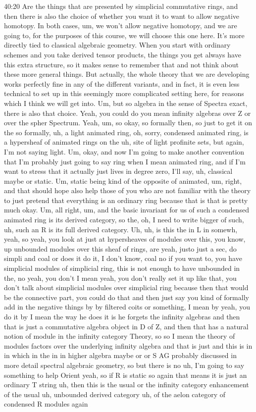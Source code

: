 \begin{unfinished}{40:20}
Are the things that are presented by simplicial commutative rings, and then there is also the choice of whether you want it to want to allow negative homotopy. In both cases, um, we won't allow negative homotopy, and we are going to, for the purposes of this course, we will choose this one here. It's more directly tied to classical algebraic geometry. When you start with ordinary schemes and you take derived tensor products, the things you get always have this extra structure, so it makes sense to remember that and not think about these more general things. But actually, the whole theory that we are developing works perfectly fine in any of the different variants, and in fact, it is even less technical to set up in this seemingly more complicated setting here, for reasons which I think we will get into. Um, but so algebra in the sense of Spectra exact, there is also that choice. Yeah, you could do you mean infinity algebras over Z or over the spher Spectrum. Yeah, um, so okay, so formally then, so just to get it on the so formally, uh, a light animated ring, oh, sorry, condensed animated ring, is a hypersheaf of animated rings on the uh, site of light profinite sets, but again, I'm not saying light. Um, okay, and now I'm going to make another convention that I'm probably just going to say ring when I mean animated ring, and if I'm want to stress that it actually just lives in degree zero, I'll say, uh, classical maybe or static. Um, static being kind of the opposite of animated, um, right, and that should hope also help those of you who are not familiar with the theory to just pretend that everything is an ordinary ring because that is that is pretty much okay. Um, all right, um, and the basic invariant for us of such a condensed animated ring is its derived category, so the, oh, I need to write bigger of such, uh, such an R is its full derived category. Uh, uh, is this the in L in somewh, yeah, so yeah, you look at just at hypersheaves of modules over this, you know, up unbounded modules over this sheaf of rings, are yeah, justo just a sec, do simpli and coal or does it do it, I don't know, coal no if you want to, you have simplicial modules of simplicial ring, this is not enough to have unbounded in the, no yeah, you don't I mean yeah, you don't really set it up like that, you don't talk about simplicial modules over simplicial ring because then that would be the connective part, you could do that and then just say you kind of formally add in the negative things by by filtered coits or something, I mean by yeah, you do it by I mean the way he does it is he forgets the infinity algebras and then that is just a commutative algebra object in D of Z, and then that has a natural notion of module in the infinity category Theory, so so I mean the theory of modules factors over the underlying infinity algebra and that is just and this is in in which in the in in higher algebra maybe or or S AG probably discussed in more detail spectral algebraic geometry, so but there is no uh, I'm going to say something to help Orient yeah, so if R is static so again that means it is just an ordinary T string uh, then this is the usual or the infinity category enhancement of the usual uh, unbounded derived category uh, of the aelon category of condensed R modules again 
\end{unfinished}
